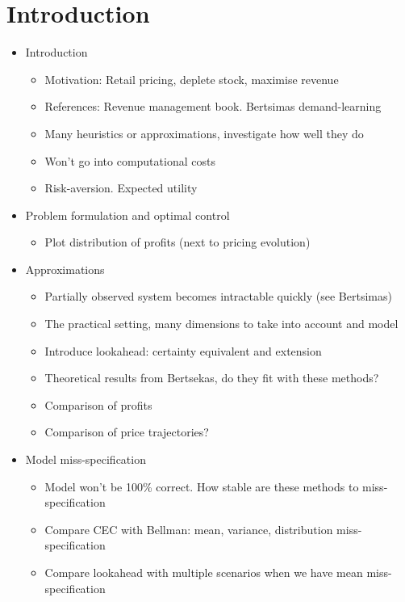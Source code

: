 \documentclass[main.tex]{subfiles}
\begin{document}
\listoftodos

\section{Introduction}

\begin{itemize}
\item Introduction
  \begin{itemize}
  \item Motivation: Retail pricing, deplete stock, maximise revenue
  \item References: Revenue management book. Bertsimas demand-learning
  \item Many heuristics or approximations, investigate how well they
    do
  \item Won't go into computational costs
  \item Risk-aversion. Expected utility
  \end{itemize}
\item Problem formulation and optimal control
  \begin{itemize}
  \item Plot distribution of profits (next to pricing evolution)
  \end{itemize}
\item Approximations
  \begin{itemize}
  \item Partially observed system becomes intractable
    quickly (see Bertsimas)
  \item The practical setting, many dimensions to take into account
    and model
  \item Introduce lookahead: certainty equivalent and extension
  \item Theoretical results from Bertsekas, do they fit with these methods?
  \item Comparison of profits
  \item Comparison of price trajectories?
  \end{itemize}
\item Model miss-specification
  \begin{itemize}
  \item Model won't be 100\% correct. How stable are these methods to miss-specification
  \item Compare CEC with Bellman: mean, variance, distribution
    miss-specification
  \item Compare lookahead with multiple scenarios when we have mean miss-specification

\end{itemize}
\end{itemize}
\end{document}

